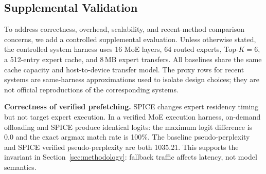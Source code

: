 
\subsection{Supplemental Validation}
\label{sec:supplemental_validation}

To address correctness, overhead, scalability, and recent-method comparison
concerns, we add a controlled supplemental evaluation. Unless otherwise stated,
the controlled system harness uses 16 MoE layers, 64 routed experts, Top-$K{=}6$,
a 512-entry expert cache, and 8\,MB expert transfers. All baselines share the
same cache capacity and host-to-device transfer model. The proxy rows for recent
systems are same-harness approximations used to isolate design choices; they are
not official reproductions of the corresponding systems.

\textbf{Correctness of verified prefetching.}
SPICE changes expert residency timing but not target expert execution. In a
verified MoE execution harness, on-demand offloading and SPICE produce identical
logits: the maximum logit difference is 0.0 and the exact argmax match rate is
100\%. The baseline pseudo-perplexity and SPICE verified pseudo-perplexity are
both 1035.21. This supports the invariant in Section~\ref{sec:methodology}:
fallback traffic affects latency, not model semantics.

\begin{table}[t]
\centering
\caption{Controlled same-harness offloading and prefetch comparison.}
\label{tab:supp_prefetch}
\scriptsize
{}
\end{table}

